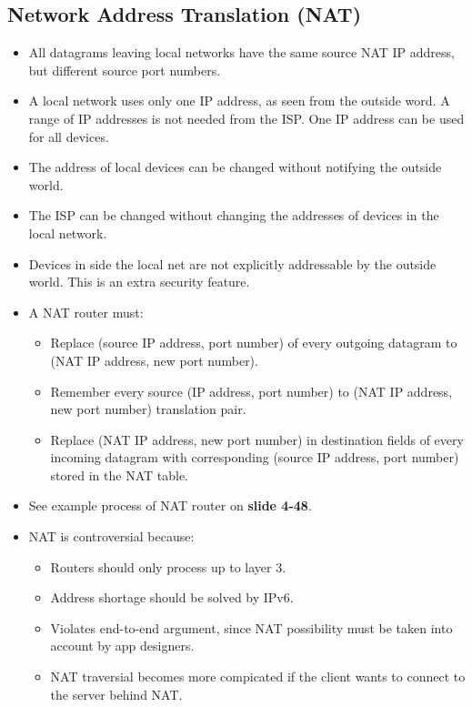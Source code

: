 \documentclass{article}
\begin{document}
\subsection{Network Address Translation (NAT)}

\begin{itemize}
\item All datagrams leaving local networks have the same source NAT IP address, but different source port numbers.
\item A local network uses only one IP address, as seen from the outside word. A range of IP addresses is not needed from the ISP. One IP address can be used for all devices.
\item The address of local devices can be changed without notifying the outside world.
\item The ISP can be changed without changing the addresses of devices in the local network.
\item Devices in side the local net are not explicitly addressable by the outside world. This is an extra security feature.
\item A NAT router must:
\begin{itemize}
\item Replace (source IP address, port number) of every outgoing datagram to (NAT IP address, new port number).
\item Remember every source (IP address, port number) to (NAT IP address, new port number) translation pair.
\item Replace (NAT IP address, new port number) in destination fields of every incoming datagram with corresponding (source IP address, port number) stored in the NAT table.
\end{itemize}
\item See example process of NAT router on {\bf slide 4-48}.
\item NAT is controversial because:
\begin{itemize}
\item Routers should only process up to layer 3.
\item Address shortage should be solved by IPv6.
\item Violates end-to-end argument, since NAT possibility must be taken into account by app designers.
\item NAT traversial becomes more compicated if the client wants to connect to the server behind NAT.
\end{itemize}
\end{itemize}
\end{document}
